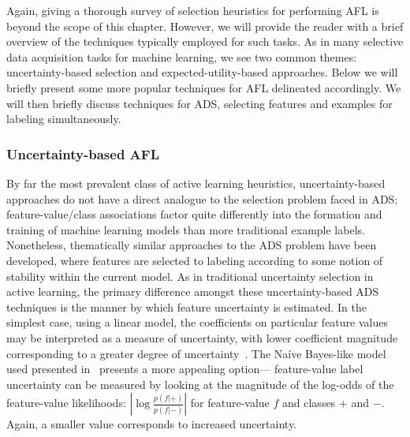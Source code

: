 Again, giving a thorough survey of selection heuristics for performing AFL  is beyond the scope of this chapter. However, we will provide the reader with a brief  overview of the techniques typically employed for such tasks. As in many selective data acquisition tasks for machine learning, we see two common themes: uncertainty-based selection and expected-utility-based approaches. Below we will briefly present some more popular techniques for AFL delineated accordingly. We will then briefly discuss techniques for ADS, selecting features and examples for labeling simultaneously.


\subsubsection{Uncertainty-based AFL}
\label{sec:usafl}
By far the most prevalent class of active learning heuristics, uncertainty-based approaches do not have a direct analogue to the selection problem faced in ADS; feature-value/class associations factor quite differently into the formation and training of machine learning models than more traditional example labels. Nonetheless, thematically similar approaches to the ADS problem have been developed, where features are selected to labeling according to some notion of stability within the current model. As in traditional uncertainty selection in active learning, the primary difference amongst these uncertainty-based ADS techniques is the manner by which feature uncertainty is estimated. In the simplest case, using a linear model, the coefficients on particular feature values may be interpreted as a measure of uncertainty, with lower coefficient magnitude corresponding to a greater degree of uncertainty~\cite{sindhwani:icml09}. The Na\'ive Bayes-like model used presented in~\cite{melville:kdd09} presents a more appealing option--- feature-value label uncertainty can be measured by looking at the magnitude of the log-odds of the feature-value likelihoods: $\left| \log \frac{p(f | +)}{p(f | -)}  \right|$ for feature-value $f$ and classes $+$ and $-$. Again, a smaller value corresponds to increased uncertainty.

